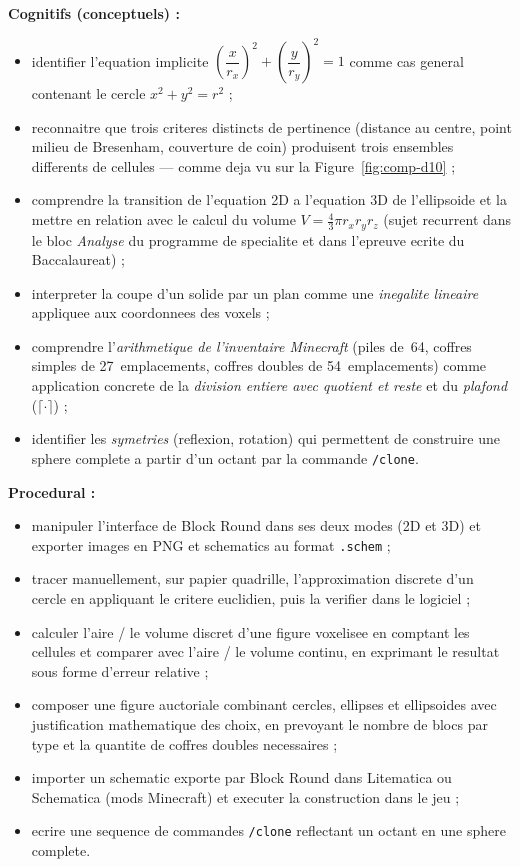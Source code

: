 \documentclass[12pt,a4paper]{scrartcl}
\newcommand{\cmd}[1]{\textcolor{earth}{\texttt{\small #1}}}
\begin{document}
\textbf{Cognitifs (conceptuels) :}
\begin{itemize}[leftmargin=1.3em,itemsep=0.2em,topsep=0.3em]
  \item identifier l'equation implicite $\left(\dfrac{x}{r_x}\right)^{\!2} + \left(\dfrac{y}{r_y}\right)^{\!2} = 1$ comme cas general contenant le cercle $x^2 + y^2 = r^2$ ;
  \item reconnaitre que trois criteres distincts de pertinence (distance au centre, point milieu de Bresenham, couverture de coin) produisent trois ensembles differents de cellules --- comme deja vu sur la Figure~\ref{fig:comp-d10} ;
  \item comprendre la transition de l'equation 2D a l'equation 3D de l'ellipsoide et la mettre en relation avec le calcul du volume $V = \tfrac{4}{3}\pi r_x r_y r_z$ (sujet recurrent dans le bloc \emph{Analyse} du programme de specialite et dans l'epreuve ecrite du Baccalaureat) ;
  \item interpreter la coupe d'un solide par un plan comme une \emph{inegalite lineaire} appliquee aux coordonnees des voxels ;
  \item comprendre l'\emph{arithmetique de l'inventaire Minecraft} (piles de~64, coffres simples de 27~emplacements, coffres doubles de 54~emplacements) comme application concrete de la \emph{division entiere avec quotient et reste} et du \emph{plafond} ($\lceil \cdot \rceil$) ;
  \item identifier les \emph{symetries} (reflexion, rotation) qui permettent de construire une sphere complete a partir d'un octant par la commande \cmd{/clone}.
\end{itemize}

\textbf{Procedural :}
\begin{itemize}[leftmargin=1.3em,itemsep=0.2em,topsep=0.3em]
  \item manipuler l'interface de Block Round dans ses deux modes (2D et 3D) et exporter images en PNG et schematics au format \texttt{.schem} ;
  \item tracer manuellement, sur papier quadrille, l'approximation discrete d'un cercle en appliquant le critere euclidien, puis la verifier dans le logiciel ;
  \item calculer l'aire / le volume discret d'une figure voxelisee en comptant les cellules et comparer avec l'aire / le volume continu, en exprimant le resultat sous forme d'erreur relative ;
  \item composer une figure auctoriale combinant cercles, ellipses et ellipsoides avec justification mathematique des choix, en prevoyant le nombre de blocs par type et la quantite de coffres doubles necessaires ;
  \item importer un schematic exporte par Block Round dans Litematica ou Schematica (mods Minecraft) et executer la construction dans le jeu ;
  \item ecrire une sequence de commandes \cmd{/clone} reflectant un octant en une sphere complete.
\end{itemize}
\end{document}
